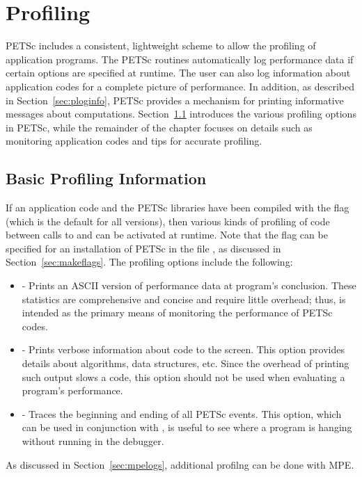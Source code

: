 \chapter{Profiling} 
\label{ch:profiling} 

PETSc includes a consistent, lightweight scheme to allow the profiling
of application programs.  The PETSc routines automatically log
performance data if certain options are specified at runtime.  The
user can also log information about application codes for a complete
picture of performance.  In addition, as described in
Section~\ref{sec:ploginfo}, PETSc provides a mechanism for printing
informative messages about computations.  Section~\ref{sec:profbasic}
introduces the various profiling options in PETSc, while the
remainder of the chapter focuses on details such as monitoring
application codes and tips for accurate profiling.  

\section{Basic Profiling Information}
\label{sec:profbasic}
   

If an application code and the PETSc libraries have been compiled with
the  flag (which is the default for all versions),
then various kinds of profiling of code between calls to  and  can be 
activated at runtime.  Note that the flag  can be
specified for an installation of PETSc in the file , as discussed in
Section~\ref{sec:makeflags}.  The profiling options include the following:
 
\begin{itemize}
\item {} - Prints an ASCII version of performance data
     at program's conclusion. These statistics are comprehensive and concise
     and require little overhead; thus,  is intended as
     the primary means of monitoring the performance of PETSc codes.
\item {} - Prints verbose information about code to the screen. 
     This option provides details about algorithms, data structures, etc.
     Since the overhead of printing such output slows a code, this
     option should not be used when evaluating a program's performance.
\item {} - Traces the beginning and ending of all
     PETSc events.  This option, which can be used in conjunction with 
     , is useful to see where a program is hanging
     without running in the debugger.  
\end{itemize}
 As discussed in Section~\ref{sec:mpelogs},
additional profilng can be done with MPE.

